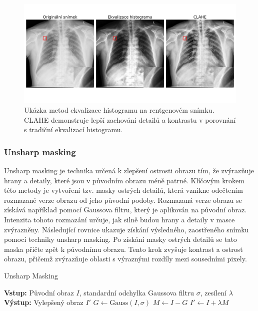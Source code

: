 \documentclass[male,czech,api_ing]{thesis}
\begin{document}
\begin{figure}[ht]
    \centering
    \includegraphics[width=\linewidth]{Prilohy/Obrazky/ImageEnhancement.png}
    \caption{Ukázka metod ekvalizace histogramu na rentgenovém snímku. CLAHE demonstruje lepší zachování detailů a kontrastu v porovnání s tradiční ekvalizací histogramu.}
    \label{fig:histogram_equalization}
\end{figure}

\subsubsection{Unsharp masking}
Unsharp masking je technika určená k zlepšení ostrosti obrazu tím, že zvýrazňuje hrany a detaily, které jsou v původním obrazu méně patrné. Klíčovým krokem této metody je vytvoření tzv. masky ostrých detailů, která vznikne odečtením rozmazané verze obrazu od jeho původní podoby. Rozmazaná verze obrazu se získává například pomocí Gaussova filtru, který je aplikován na původní obraz. Intenzita tohoto rozmazání určuje, jak silně budou hrany a detaily v masce zvýrazněny. Následující rovnice ukazuje získání výsledného, zaostřeného snímku pomocí techniky unsharp masking. Po získání masky ostrých detailů se tato maska přičte zpět k původnímu obrazu. Tento krok zvyšuje kontrast a ostrost obrazu, přičemž zvýrazňuje oblasti s výraznými rozdíly mezi sousedními pixely. \cite{UnsharpMasking}

\begin{algorithm}
    \caption{Unsharp Masking}
    \begin{algorithmic}[1]
        \State \textbf{Vstup:} Původní obraz $I$, standardní odchylka Gaussova filtru $\sigma$, zesílení $\lambda$
        \State \textbf{Výstup:} Vylepšený obraz $I'$
        \State $G \gets \text{Gauss}(I, \sigma)$ 
        \State $M \gets I - G$ 
        \State $I' \gets I + \lambda M$ 
    \end{algorithmic}
\end{algorithm}
\end{document}
